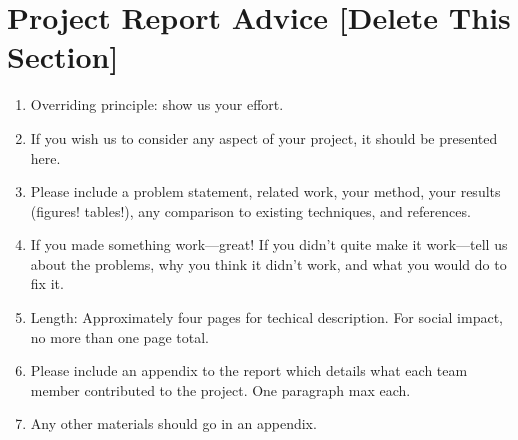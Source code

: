\author{
    \emph{Team name}: Quinn Brighton, Nishani Clarke, Alexandra McIntyre.\\
    \emph{TA name:} Kelvin Jiang.
    Brown University\\
}

\maketitle

\begin{abstract}
Recovering the 3D geometry of sailboat races from monocular drone footage is challenging due to changing viewpoints, occlusion, water reflections, and the absence of camera calibration or GPS measurements. We present a pipeline for metric sailboat pose estimation using a frozen DINOv3 visual backbone, lightweight learned keypoint heads, and a geometric optimization solver. Our method predicts four keypoints per boat --- mast top, mast base, bow, and stern --- through a staged conditioning pipeline consisting of a CNN tip detector followed by transformer-based base and hull predictors. These image-space detections are then used in a single-frame reprojection solver that jointly estimates camera pose and per-boat 3D position, orientation, and heel angle using known sailboat geometry. To improve robustness, the solver iteratively removes high-error outlier keypoints before final refinement. On out-of-sample regatta footage, our system recovers six boats simultaneously with approximately 2.5-pixel reprojection accuracy on 1080p imagery while producing metrically-scaled top-down reconstructions of the race.
\end{abstract}


\section{Project Report Advice [Delete This Section]}

\begin{enumerate}
    \item Overriding principle: show us your effort.
    \item If you wish us to consider any aspect of your project, it should be presented here. \item Please include a problem statement, related work, your method, your results (figures! tables!), any comparison to existing techniques, and references. 
    \item If you made something work---great! If you didn't quite make it work---tell us about the problems, why you think it didn't work, and what you would do to fix it.
    \item Length: Approximately four pages for techical description. For social impact, no more than one page total.
    \item Please include an appendix to the report which details what each team member contributed to the project. One paragraph max each.
    \item Any other materials should go in an appendix.
\end{enumerate}


